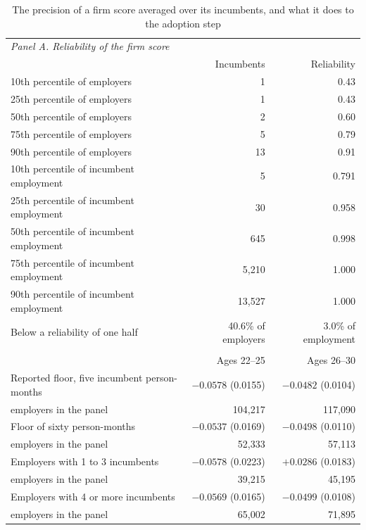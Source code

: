 \begin{table}[ht!]
\centering
\caption{The precision of a firm score averaged over its incumbents, and what it does to the adoption step}
\label{tab:size_reliability}
\footnotesize
\begin{tabular}{lrr}
\toprule
\multicolumn{3}{l}{\textit{Panel A. Reliability of the firm score}} \\
 & Incumbents & Reliability \\
\midrule
10th percentile of employers & 1 & 0.43 \\
25th percentile of employers & 1 & 0.43 \\
50th percentile of employers & 2 & 0.60 \\
75th percentile of employers & 5 & 0.79 \\
90th percentile of employers & 13 & 0.91 \\
10th percentile of incumbent employment & 5 & 0.791 \\
25th percentile of incumbent employment & 30 & 0.958 \\
50th percentile of incumbent employment & 645 & 0.998 \\
75th percentile of incumbent employment & 5,210 & 1.000 \\
90th percentile of incumbent employment & 13,527 & 1.000 \\
\addlinespace[2pt]
Below a reliability of one half & 40.6\% of employers & 3.0\% of employment \\
\addlinespace[4pt]
\midrule
\multicolumn{3}{l}{\textit{Panel B. The adoption step by the number of incumbents behind the score}} \\
 & Ages 22--25 & Ages 26--30 \\
\midrule
Reported floor, five incumbent person-months & $-0.0578$ (0.0155) & $-0.0482$ (0.0104) \\
\quad employers in the panel & 104,217 & 117,090 \\
Floor of sixty person-months & $-0.0537$ (0.0169) & $-0.0498$ (0.0110) \\
\quad employers in the panel & 52,333 & 57,113 \\
Employers with 1 to 3 incumbents & $-0.0578$ (0.0223) & $+0.0286$ (0.0183) \\
\quad employers in the panel & 39,215 & 45,195 \\
Employers with 4 or more incumbents & $-0.0569$ (0.0165) & $-0.0499$ (0.0108) \\
\quad employers in the panel & 65,002 & 71,895 \\

\end{tabular}
\end{table}
